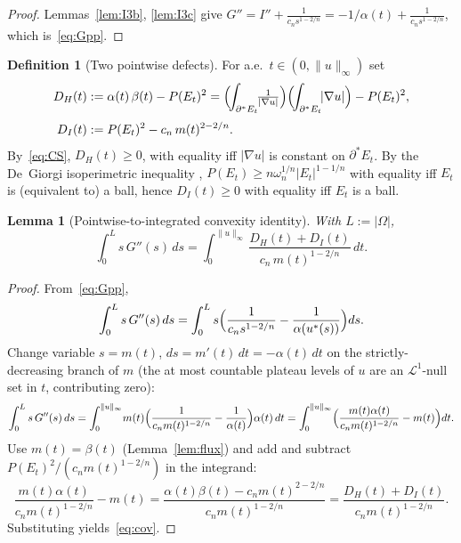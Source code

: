 \documentclass[11pt]{article}
\newtheorem{lemma}[theorem]{Lemma}
\theoremstyle{definition}
\newtheorem{definition}[theorem]{Definition}
\newcommand{\Om}{\Omega}
\begin{document}
\begin{proof}
Lemmas~\ref{lem:I3b}, \ref{lem:I3c} give $G''=I''+\frac{1}{c_{n}s^{1-2/n}}
=-1/\alpha(t)+\frac{1}{c_{n}s^{1-2/n}}$, which is~\eqref{eq:Gpp}.
\end{proof}

\begin{definition}[Two pointwise defects]\label{def:DHDI}
For a.e.\ $t\in(0,\|u\|_{\infty})$ set
\begin{align}
   D_{H}(t)&:=\alpha(t)\,\beta(t)-P(E_{t})^{2}
            =\Bigl(\!\int_{\partial^{*}E_{t}}\!\!\tfrac{1}{|\nabla u|}\Bigr)
              \Bigl(\!\int_{\partial^{*}E_{t}}\!\!|\nabla u|\Bigr)-P(E_{t})^{2},
              \label{eq:DH-def}\\[1mm]
   D_{I}(t)&:=P(E_{t})^{2}-c_{n}\,m(t)^{2-2/n}.
              \label{eq:DI-def}
\end{align}
By~\eqref{eq:CS}, $D_{H}(t)\ge 0$, with equality iff $|\nabla u|$ is
constant on $\partial^{*}E_{t}$. By the De~Giorgi isoperimetric
inequality \cite{DeGiorgi1958}, $P(E_{t})\ge n\omega_{n}^{1/n}|E_{t}|^{1-1/n}$
with equality iff $E_{t}$ is (equivalent to) a ball, hence
$D_{I}(t)\ge 0$ with equality iff $E_{t}$ is a ball.
\end{definition}

\begin{lemma}[Pointwise-to-integrated convexity identity]\label{lem:cov}
With $L:=|\Om|$,
\begin{equation}\label{eq:cov}
   \int_{0}^{L}s\,G''(s)\,ds
   =\int_{0}^{\|u\|_{\infty}}\frac{D_{H}(t)+D_{I}(t)}{c_{n}\,m(t)^{1-2/n}}\,dt.
\end{equation}
\end{lemma}

\begin{proof}
From~\eqref{eq:Gpp},
\[
   \int_{0}^{L}s\,G''(s)\,ds
   =\int_{0}^{L}s\Bigl(\frac{1}{c_{n}s^{1-2/n}}-\frac{1}{\alpha(u^{*}(s))}\Bigr)ds.
\]
Change variable $s=m(t)$, $ds=m'(t)\,dt=-\alpha(t)\,dt$ on the
strictly-decreasing branch of $m$ (the at most countable plateau levels
of $u$ are an $\mathcal L^{1}$-null set in $t$, contributing zero):
\[
   \int_{0}^{L}s\,G''(s)\,ds
   =\int_{0}^{\|u\|_{\infty}}\!m(t)\Bigl(\frac{1}{c_{n}m(t)^{1-2/n}}-
      \frac{1}{\alpha(t)}\Bigr)\alpha(t)\,dt
   =\int_{0}^{\|u\|_{\infty}}\Bigl(
      \frac{m(t)\alpha(t)}{c_{n}m(t)^{1-2/n}}-m(t)\Bigr)dt.
\]
Use $m(t)=\beta(t)$ (Lemma~\ref{lem:flux}) and add and subtract
$P(E_{t})^{2}/(c_{n}m(t)^{1-2/n})$ in the integrand:
\[
   \frac{m(t)\alpha(t)}{c_{n}m(t)^{1-2/n}}-m(t)
   =\frac{\alpha(t)\beta(t)-c_{n}m(t)^{2-2/n}}{c_{n}m(t)^{1-2/n}}
   =\frac{D_{H}(t)+D_{I}(t)}{c_{n}m(t)^{1-2/n}}.
\]
Substituting yields~\eqref{eq:cov}.
\end{proof}
\end{document}
